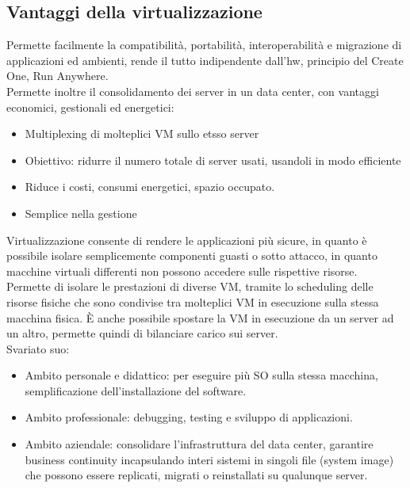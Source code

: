 \documentclass[16px]{article}
\begin{document}
\subsection{Vantaggi della virtualizzazione}
Permette facilmente la compatibilità, portabilità, interoperabilità e migrazione di applicazioni ed ambienti, rende il tutto indipendente dall'hw, principio del Create One, Run Anywhere.\\ Permette inoltre il consolidamento dei server in un data center, con vantaggi economici, gestionali ed energetici:
\begin{itemize}
\item Multiplexing di molteplici VM sullo etsso server
\item Obiettivo: ridurre il numero totale di server usati, usandoli in modo efficiente
\item Riduce i costi, consumi energetici, spazio occupato.
\item Semplice nella gestione
\end{itemize}
Virtualizzazione consente di rendere le applicazioni più sicure, in quanto è possibile isolare semplicemente componenti guasti o sotto attacco, in quanto macchine virtuali differenti non possono accedere sulle rispettive risorse.\\ Permette di isolare le prestazioni di diverse VM, tramite lo scheduling delle risorse fisiche che sono condivise tra molteplici VM in esecuzione sulla stessa macchina fisica. È anche possibile spostare la VM in esecuzione da un server ad un altro, permette quindi di bilanciare carico sui server.\\ Svariato suo:
\begin{itemize}
\item Ambito personale e didattico: per eseguire più SO sulla stessa macchina, semplificazione dell'installazione del software.
\item Ambito professionale: debugging, testing e sviluppo di applicazioni.
\item Ambito aziendale: consolidare l'infrastruttura del data center, garantire business continuity incapsulando interi sistemi in singoli file (system image) che possono essere replicati, migrati o reinstallati su qualunque server. 
\end{itemize}
\end{document}
